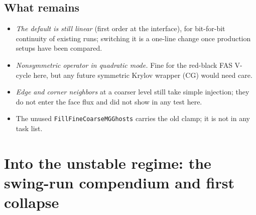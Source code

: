 \documentclass[11pt]{article}
\newcommand{\fn}[1]{\texttt{#1}}
\begin{document}
\subsection{What remains}
\begin{itemize}\itemsep2pt
\item \emph{The default is still linear} (first order at the interface), for bit-for-bit
      continuity of existing runs; switching it is a one-line change once production setups have
      been compared.
\item \emph{Nonsymmetric operator in quadratic mode.} Fine for the red-black FAS V-cycle here,
      but any future symmetric Krylov wrapper (CG) would need care.
\item \emph{Edge and corner neighbors} at a coarser level still take simple injection; they do not
      enter the face flux and did not show in any test here.
\item The unused \fn{FillFineCoarseMGGhosts} carries the old clamp; it is not in any task list.
\end{itemize}

\section{Into the unstable regime: the swing-run compendium and first collapse}
\label{sec:collapse}
\end{document}
